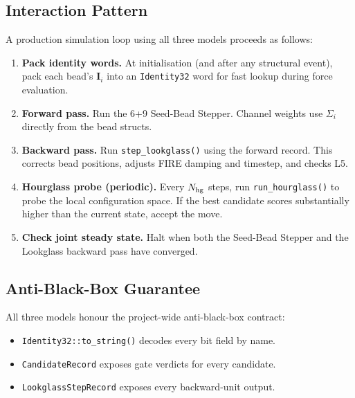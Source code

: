 \documentclass[11pt, a4paper, oneside]{article}
\theoremstyle{definition}
\newcommand{\boldI}{\bm{I}}
\begin{document}
\subsection{Interaction Pattern}

A production simulation loop using all three models proceeds as follows:

\begin{enumerate}[label=\textbf{\arabic*.}]
  \item \textbf{Pack identity words.}
        At initialisation (and after any structural event), pack each
        bead's $\boldI_i$ into an \texttt{Identity32} word for fast
        lookup during force evaluation.

  \item \textbf{Forward pass.}
        Run the 6+9 Seed-Bead Stepper.  Channel weights use
        $\Sigma_i$ directly from the bead structs.

  \item \textbf{Backward pass.}
        Run \texttt{step\_lookglass()} using the forward record.
        This corrects bead positions, adjusts FIRE damping and
        timestep, and checks L5.

  \item \textbf{Hourglass probe (periodic).}
        Every $N_{\rm hg}$ steps, run \texttt{run\_hourglass()} to
        probe the local configuration space.  If the best candidate
        scores substantially higher than the current state, accept
        the move.

  \item \textbf{Check joint steady state.}
        Halt when both the Seed-Bead Stepper and the Lookglass
        backward pass have converged.
\end{enumerate}

\subsection{Anti-Black-Box Guarantee}

All three models honour the project-wide anti-black-box contract:

\begin{itemize}
  \item \texttt{Identity32::to\_string()} decodes every bit field by name.
  \item \texttt{CandidateRecord} exposes gate verdicts for every candidate.
  \item \texttt{LookglassStepRecord} exposes every backward-unit output.
\end{itemize}
\end{document}
